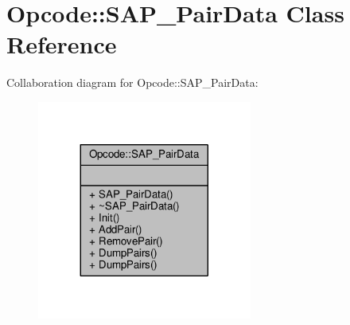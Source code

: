 \hypertarget{classOpcode_1_1SAP__PairData}{}\section{Opcode\+:\+:S\+A\+P\+\_\+\+Pair\+Data Class Reference}
\label{classOpcode_1_1SAP__PairData}


Collaboration diagram for Opcode\+:\+:S\+A\+P\+\_\+\+Pair\+Data\+:
\nopagebreak
\begin{figure}[H]
\begin{center}
\leavevmode
\includegraphics[width=200pt]{d8/df4/classOpcode_1_1SAP__PairData__coll__graph}
\end{center}
\end{figure}

